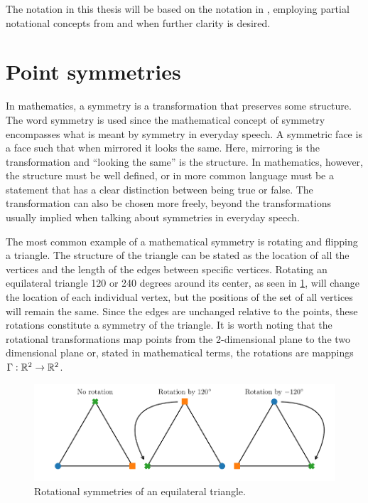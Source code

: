 The notation in this thesis will be based on the notation in \cite{hydon2000symmetry}, employing partial notational concepts from \cite{olver1995equivalence} and \cite{ovsiannikov1982group} when further clarity is desired.

\section{Point symmetries}

In mathematics, a symmetry is a transformation that preserves some structure.
The word symmetry is used since the mathematical concept of symmetry encompasses what is meant by symmetry in everyday speech.
A symmetric face is a face such that when mirrored it looks the same.
Here, mirroring is the transformation and \enquote{looking the same} is the structure.
In mathematics, however, the structure must be well defined, or in more common language must be a statement that has a clear distinction between being true or false.
The transformation can also be chosen more freely, beyond the transformations usually implied when talking about symmetries in everyday speech.

The most common example of a mathematical symmetry is rotating and flipping a triangle.
The structure of the triangle can be stated as the location of all the vertices and the length of the edges between specific vertices.
Rotating an equilateral triangle 120 or 240 degrees around its center, as seen in \cref{fig:triangle-rotation}, will change the location of each individual vertex, but the positions of the set of all vertices will remain the same.
Since the edges are unchanged relative to the points, these rotations constitute a symmetry of the triangle.
It is worth noting that the rotational transformations map points from the 2-dimensional plane to the two dimensional plane or, stated in mathematical terms, the rotations are mappings \(\Gamma: \mathbb{R}^2 \to \mathbb{R}^2\).
\begin{figure}
  \centering
  \includegraphics[width=.96\textwidth]{images/triangles}
  \caption{Rotational symmetries of an equilateral triangle.}
  \label{fig:triangle-rotation}
\end{figure}

